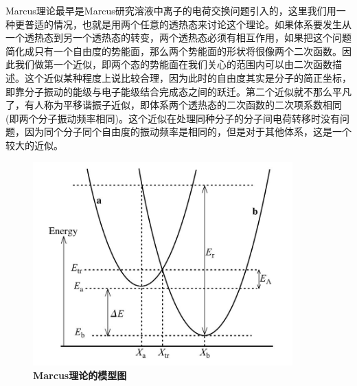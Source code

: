 \documentclass[12pt,a4paper,openany,twoside]{book}
\numberwithin{equation}{section}
\begin{document}
        Marcus理论最早是Marcus研究溶液中离子的电荷交换问题引入的\cite{Marcus1993}，这里我们用一种更普适的情况，也就是用两个任意的透热态来讨论这个理论。如果体系要发生从一个透热态到另一个透热态的转变，两个透热态必须有相互作用，如果把这个问题简化成只有一个自由度的势能面，那么两个势能面的形状将很像两个二次函数。因此我们做第一个近似，即两个态的势能面在我们关心的范围内可以由二次函数描述。这个近似某种程度上说比较合理，因为此时的自由度其实是分子的简正坐标，即靠分子振动的能级与电子能级结合完成态之间的跃迁。第二个近似就不那么平凡了，有人称为平移谐振子近似，即体系两个透热态的二次函数的二次项系数相同(即两个分子振动频率相同)。这个近似在处理同种分子的分子间电荷转移时没有问题，因为同个分子同个自由度的振动频率是相同的，但是对于其他体系，这是一个较大的近似。
        \begin{figure}
          \centering
          \label{Marcus figure}
          \includegraphics[width=10cm]{fig/Marcus.jpg}
          \caption{\textbf{Marcus理论的模型图}}
        \end{figure}
\end{document}
